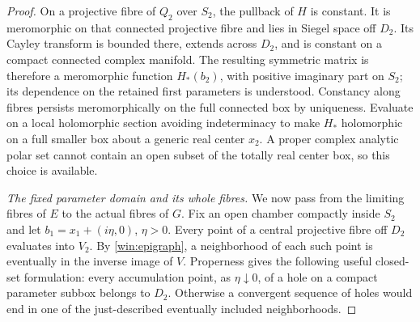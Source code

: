 \begin{proof}
On a projective fibre of $Q_2$ over $S_2$, the pullback of $H$ is
constant.  It is meromorphic on that connected projective fibre and
lies in Siegel space off $D_2$.  Its Cayley transform is bounded
there, extends across $D_2$, and is constant on a compact connected
complex manifold.  The resulting symmetric matrix is therefore a
meromorphic function $H_*(b_2)$, with positive imaginary part on
$S_2$; its dependence on the retained first parameters is understood.
Constancy along fibres persists meromorphically on the full connected
box by uniqueness.  Evaluate on a local holomorphic section avoiding
indeterminacy to make $H_*$ holomorphic on a full smaller box about
a generic real center $x_2$.  A proper complex analytic polar set
cannot contain an open subset of the totally real center box, so
this choice is available.

\emph{The fixed parameter domain and its whole fibres.}
We now pass from the limiting fibres of $E$ to the actual fibres of
$G$.  Fix an open chamber compactly inside $S_2$ and let
$b_1=x_1+(i\eta,0)$, $\eta>0$.  Every point of a central projective
fibre off $D_2$ evaluates into $V_2$.  By
\eqref{win:epigraph}, a neighborhood of each such point is eventually
in the inverse image of $V$.  Properness gives the following useful
closed-set formulation: every accumulation point, as $\eta\downarrow0$,
of a hole on a compact parameter subbox belongs to $D_2$.  Otherwise
a convergent sequence of holes would end in one of the just-described
eventually included neighborhoods.


\end{proof}
